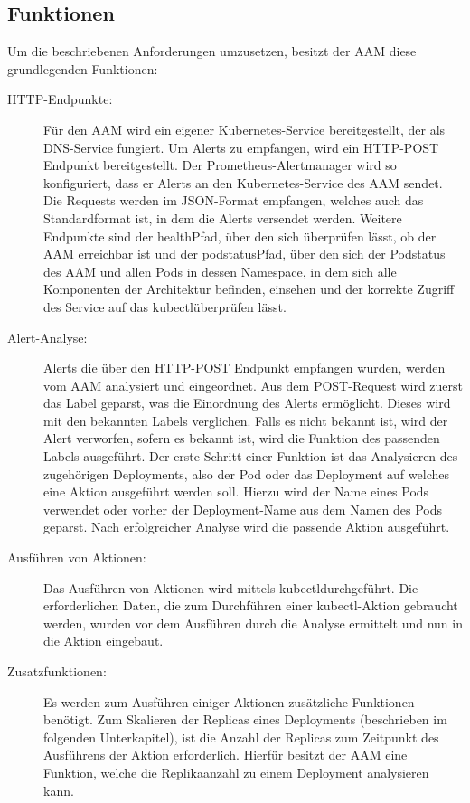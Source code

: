 \documentclass[a4paper,10pt]{scrartcl}
\begin{document}
\subsection{Funktionen}

Um die beschriebenen Anforderungen umzusetzen, besitzt der AAM diese grundlegenden Funktionen:\\

\begin{description}

\item[HTTP-Endpunkte:]
Für den AAM wird ein eigener Kubernetes-Service bereitgestellt, der als DNS-Service fungiert.
Um Alerts zu empfangen, wird ein HTTP-POST Endpunkt bereitgestellt. Der Prometheus-Alertmanager wird so konfiguriert, dass er Alerts an den Kubernetes-Service des AAM sendet. Die Requests werden im JSON-Format empfangen, welches auch das Standardformat ist, in dem die Alerts versendet werden.
Weitere Endpunkte sind der \glqq health\grqq Pfad, über den sich überprüfen lässt, ob der AAM erreichbar ist und der \glqq podstatus\grqq Pfad, über den sich der Podstatus des AAM und allen Pods in dessen Namespace, in dem sich alle Komponenten der Architektur befinden, einsehen und der korrekte Zugriff des Service auf das \glqq kubectl\grqq überprüfen lässt.
\item[Alert-Analyse:]
Alerts die über den HTTP-POST Endpunkt empfangen wurden, werden vom AAM analysiert und eingeordnet. Aus dem POST-Request wird zuerst das Label geparst, was die Einordnung des Alerts ermöglicht. Dieses wird mit den bekannten Labels verglichen. Falls es nicht bekannt ist, wird der Alert verworfen, sofern es bekannt ist, wird die Funktion des passenden Labels ausgeführt. Der erste Schritt einer Funktion ist das Analysieren des zugehörigen Deployments, also der Pod oder das Deployment auf welches eine Aktion ausgeführt werden soll. Hierzu wird der Name eines Pods verwendet oder vorher der Deployment-Name aus dem Namen des Pods geparst.
Nach erfolgreicher Analyse wird die passende Aktion ausgeführt.
\item[Ausführen von Aktionen:]
Das Ausführen von Aktionen wird mittels \glqq kubectl\grqq durchgeführt. Die erforderlichen Daten, die zum Durchführen einer kubectl-Aktion gebraucht werden, wurden vor dem Ausführen durch die Analyse ermittelt und nun in die Aktion eingebaut.
\item[Zusatzfunktionen:]
Es werden zum Ausführen einiger Aktionen zusätzliche Funktionen benötigt. Zum Skalieren der Replicas eines Deployments (beschrieben im folgenden Unterkapitel), ist die Anzahl der Replicas zum Zeitpunkt des Ausführens der Aktion erforderlich. Hierfür besitzt der AAM eine Funktion, welche die Replikaanzahl zu einem Deployment analysieren kann.

\end{description}
\end{document}
